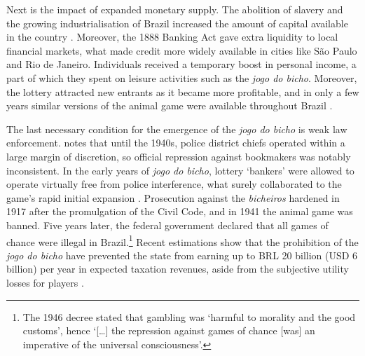 \documentclass[a4paper,12pt]{article}
\begin{document}
Next is the impact of expanded monetary supply. The abolition of slavery and the growing industrialisation of Brazil increased the amount of capital available in the country \citep{franco1987reformas, schulz2008financial}. Moreover, the 1888 Banking Act gave extra liquidity to local financial markets, what made credit more widely available in cities like São Paulo and Rio de Janeiro. Individuals received a temporary boost in personal income, a part of which they spent on leisure activities such as the \textit{jogo do bicho}. Moreover, the lottery attracted new entrants as it became more profitable, and in only a few years similar versions of the animal game were available throughout Brazil \citep[79]{da1999aguias}.  

The last necessary condition for the emergence of the \textit{jogo do bicho} is weak law enforcement. \citet[69--100]{chazkel2011laws} notes that until the 1940s, police district chiefs operated within a large margin of discretion, so official repression against bookmakers was notably inconsistent. In the early years of \textit{jogo do bicho}, lottery `bankers' were allowed to operate virtually free from police interference, what surely collaborated to the game's rapid initial expansion \citep[544]{chazkel2007beyond}. Prosecution against the \textit{bicheiros} hardened in 1917 after the promulgation of the Civil Code, and in 1941 the animal game was banned. Five years later, the federal government declared that all games of chance were illegal in Brazil.\footnote{The 1946 decree stated that gambling was `harmful to morality and the good customs', hence `[\dots] the repression against games of chance [was] an imperative of the universal consciousness'.} Recent estimations show that the prohibition of the \textit{jogo do bicho} have prevented the state from earning up to BRL 20 billion (USD 6 billion) per year in expected taxation revenues, aside from the subjective utility losses for players \citep{fsp2016legalizarbicho}.
\end{document}
